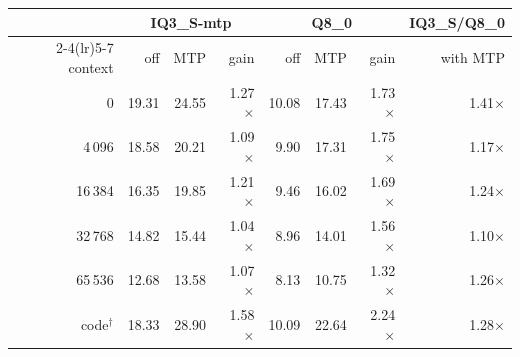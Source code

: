 \begin{tabular}{r rrr rrr r}
\toprule
 & \multicolumn{3}{c}{IQ3\_S-mtp} & \multicolumn{3}{c}{Q8\_0} & IQ3\_S/Q8\_0 \\
\cmidrule(lr){2-4}\cmidrule(lr){5-7}
context & off & MTP & gain & off & MTP & gain & with MTP \\
\midrule
0 & 19.31 & 24.55 & 1.27$\times$ & 10.08 & 17.43 & 1.73$\times$ & 1.41$\times$ \\
4\,096 & 18.58 & 20.21 & 1.09$\times$ & 9.90 & 17.31 & 1.75$\times$ & 1.17$\times$ \\
16\,384 & 16.35 & 19.85 & 1.21$\times$ & 9.46 & 16.02 & 1.69$\times$ & 1.24$\times$ \\
32\,768 & 14.82 & 15.44 & 1.04$\times$ & 8.96 & 14.01 & 1.56$\times$ & 1.10$\times$ \\
65\,536 & 12.68 & 13.58 & 1.07$\times$ & 8.13 & 10.75 & 1.32$\times$ & 1.26$\times$ \\
\midrule
code$^\dagger$ & 18.33 & 28.90 & 1.58$\times$ & 10.09 & 22.64 & 2.24$\times$ & 1.28$\times$ \\
\bottomrule
\end{tabular}
